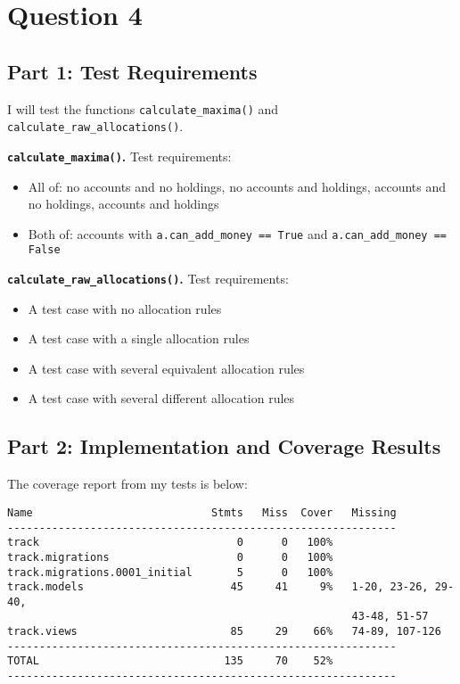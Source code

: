 \documentclass[12pt]{article}
\begin{document}
\section*{Question 4}

\subsection*{Part 1: Test Requirements}
I will test the functions \verb+calculate_maxima()+ and \verb+calculate_raw_allocations()+.

{\bf \verb+calculate_maxima()+.} Test requirements:
\begin{itemize}
\item All of: no accounts and no holdings, no accounts and holdings, accounts and no holdings, accounts and holdings
\item Both of: accounts with \verb+a.can_add_money == True+ and \verb+a.can_add_money == False+
\end{itemize}

{\bf \verb+calculate_raw_allocations()+.} Test requirements:
\begin{itemize}
\item A test case with no allocation rules
\item A test case with a single allocation rules
\item A test case with several equivalent allocation rules
\item A test case with several different allocation rules
\end{itemize}

\subsection*{Part 2: Implementation and Coverage Results}
The coverage report from my tests is below:
\begin{verbatim}
Name                            Stmts   Miss  Cover   Missing
-------------------------------------------------------------
track                               0      0   100%   
track.migrations                    0      0   100%   
track.migrations.0001_initial       5      0   100%   
track.models                       45     41     9%   1-20, 23-26, 29-40,
                                                      43-48, 51-57
track.views                        85     29    66%   74-89, 107-126
-------------------------------------------------------------
TOTAL                             135     70    52%   
-------------------------------------------------------------
\end{verbatim}
\end{document}
